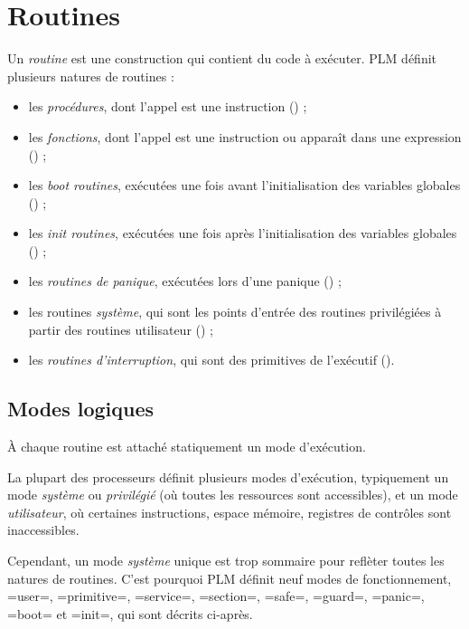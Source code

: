 




\chapter{Routines}

Un \emph{routine} est une construction qui contient du code à exécuter. PLM définit plusieurs natures de routines :
\begin{itemize}
  \item les \emph{procédures}, dont l'appel est une instruction () ;
  \item les \emph{fonctions}, dont l'appel est une instruction ou apparaît dans une expression () ;
  \item les \emph{boot routines}, exécutées une fois avant l'initialisation des variables globales () ;
  \item les \emph{init routines}, exécutées une fois après l'initialisation des variables globales () ;
  \item les \emph{routines de panique}, exécutées lors d'une panique () ;
  \item les routines \emph{système}, qui sont les points d'entrée des routines privilégiées à partir des routines utilisateur () ;
  \item les \emph{routines d'interruption}, qui sont des primitives de l'exécutif ().
\end{itemize}


\section{Modes logiques}

À chaque routine est attaché statiquement un mode d'exécution.

La plupart des processeurs définit plusieurs modes d'exécution, typiquement un mode \emph{système} ou \emph{privilégié} (où toutes les ressources sont accessibles), et un mode \emph{utilisateur}, où certaines instructions, espace mémoire, registres de contrôles sont inaccessibles.

Cependant, un mode \emph{système} unique est trop sommaire pour reflèter toutes les natures de routines. C'est pourquoi PLM définit neuf modes de fonctionnement, \plm=user=, \plm=primitive=, \plm=service=, \plm=section=, \plm=safe=, \plm=guard=, \plm=panic=, \plm=boot= et \plm=init=, qui sont décrits ci-après.


